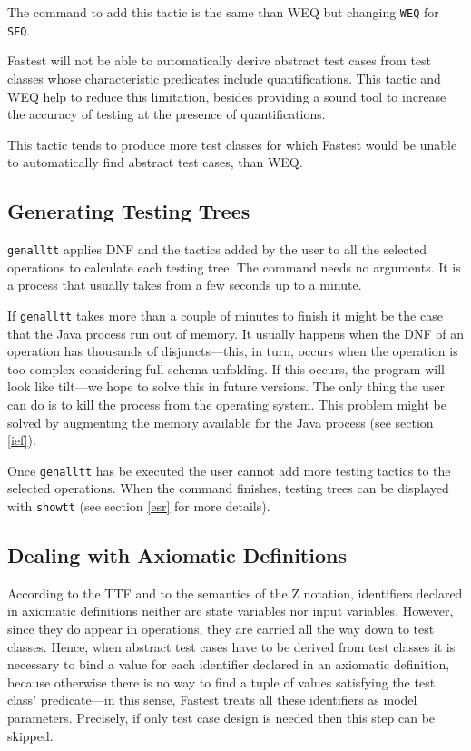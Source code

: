 The command to add this tactic is the same than WEQ but changing \verb+WEQ+ for \verb+SEQ+.

\vspace{5mm} Fastest will not be able to automatically derive abstract test cases from test classes whose characteristic predicates include quantifications. This tactic and WEQ help to reduce this limitation, besides providing a sound tool to increase the accuracy of testing at the presence of quantifications.\vspace{5mm}

\vspace{5mm} This tactic tends to produce more test classes for which Fastest would be unable to automatically find abstract test cases, than WEQ.\vspace{5mm}

\subsection{\label{genalltt}Generating Testing Trees}

\verb+genalltt+ applies DNF and the tactics added by the user to all the selected operations to calculate each testing tree. The command needs no arguments. It is a process that usually takes from a few seconds up to a minute. 

\vspace{5mm} If \verb+genalltt+ takes more than a couple of minutes to finish it might be the case that the Java process run out of memory. It usually happens when the DNF of an operation has thousands of disjuncts---this, in turn, occurs when the operation is too complex considering full schema unfolding. If this occurs, the program will look like tilt---we hope to solve this in future versions. The only thing the user can do is to kill the process from the operating system. This problem might be solved by augmenting the memory available for the Java process (see section \ref{ief}). \vspace{5mm}

Once \verb+genalltt+ has be executed the user cannot add more testing tactics to the selected operations. When the command finishes, testing trees can be displayed with \verb+showtt+ (see section \ref{esr} for more details).


\subsection{\label{axdef}Dealing with Axiomatic Definitions}
According to the TTF and to the semantics of the Z notation, identifiers declared in axiomatic definitions neither are state variables nor input variables. However, since they do appear in operations, they are carried all the way down to test classes. Hence, when abstract test cases have to be derived from test classes it is necessary to bind a value for each identifier declared in an axiomatic definition, because otherwise there is no way to find a tuple of values satisfying the test class' predicate---in this sense, Fastest treats all these identifiers as model parameters. Precisely, if only test case design is needed then this step can be skipped.

